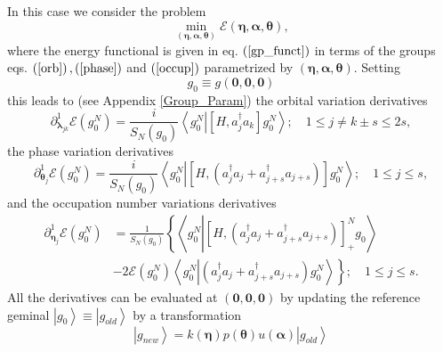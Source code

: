 \documentclass[aps,preprint]{revtex4}%
\begin{document}
In this case we consider the problem
\begin{equation}
\min_{\left(  \bm{\eta,\alpha,\theta}\right)  }\mathcal{E}\left(
\bm{\eta,\alpha,\theta}\right)  ,
\end{equation}
where the energy functional is given in eq. $\left(  \ref{gp_funct}\right)  $
in terms of the groups eqs. $\left(  \ref{orb}\right)  ,\left(  \ref{phase}%
\right)  $ and $\left(  \ref{occup}\right)  $ parametrized by $\left(
\bm{\eta,\alpha,\theta}\right)  $. Setting
\begin{equation}
g_{0}\equiv g\left(  \bm{0,0,0}\right)
\end{equation}
this leads to (see Appendix \ref{Group_Param}) the orbital variation
derivatives
\begin{equation}
\partial_{\bm{\lambda}_{jk}}^{1}\mathcal{E}\left(  g_{0}^{N}\right)  =\frac
{i}{S_{N}\left(  g_{0}\right)  }\left\langle g_{0}^{N}\left\vert \left[
H,a_{j}^{\dagger}a_{k}\right]  g_{0}^{N}\right.  \right\rangle ;\quad1\leq
j\neq k\pm s\leq2s,
\end{equation}
the phase variation derivatives
\begin{equation}
\partial_{\bm{\theta}_{j}}^{1}\mathcal{E}\left(  g_{0}^{N}\right)  =\frac
{i}{S_{N}\left(  g_{0}\right)  }\left\langle g_{0}^{N}\left\vert \left[
H,\left(  a_{j}^{\dagger}a_{j}+a_{j+s}^{\dagger}a_{j+s}\right)  \right]
g_{0}^{N}\right.  \right\rangle ;\quad1\leq j\leq s,
\end{equation}
and the occupation number variations derivatives
\begin{align}
\partial_{\bm{\eta}_{j}}^{1}\mathcal{E}\left(  g_{0}^{N}\right)   &  =\frac
{1}{S_{N}\left(  g_{0}\right)  }\left\{  \left\langle g_{0}^{N}\left\vert
\left[  H,\left(  a_{j}^{\dagger}a_{j}+a_{j+s}^{\dagger}a_{j+s}\right)
\right]  _{+}^{N}g_{0}\right.  \right\rangle \right. \nonumber\\
&  -\left.  2\mathcal{E}\left(  g_{0}^{N}\right)  \left\langle g_{0}%
^{N}\left\vert \left(  a_{j}^{\dagger}a_{j}+a_{j+s}^{\dagger}a_{j+s}\right)
g_{0}^{N}\right.  \right\rangle \right\}  ;\quad1\leq j\leq s.
\end{align}
All the derivatives can be evaluated at $\left(  \bm{0},\bm{0},\bm{0}\right)
$ by updating the reference geminal $\left\vert g_{0}\right\rangle
\equiv\left\vert g_{old}\right\rangle $ by a transformation
\begin{equation}
\left\vert g_{new}\right\rangle =k\left(  \bm{\eta}\right)  p\left(
\bm{\theta}\right)  u\left(  \bm{\alpha}\right)  \left\vert g_{old}%
\right\rangle
\end{equation}
\end{document}
